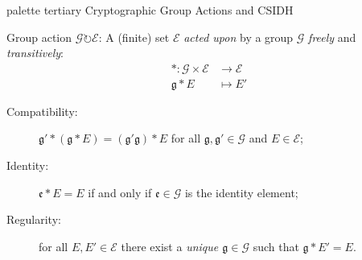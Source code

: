 \documentclass[aspectratio=169]{beamer}
\newcommand{\g}{{\mathfrak{g}}}
\newcommand{\G}{{\mathcal{G}}}
\newcommand{\E}{{\mathcal{E}}}
\begin{document}

\begin{frame}[plain]
  \begin{beamercolorbox}[sep=0.1px,center,wd=\paperwidth,sep=0.5\paperheight]{palette tertiary}
        \Huge\centering Cryptographic Group Actions and CSIDH
  \end{beamercolorbox}
\end{frame}


\begin{frame}
  \begin{block}{Group action}
    \emph{$\G\circlearrowright\E$}: A (finite) set $\E$ \emph{acted
      upon} by a group $\G$ \emph{freely} and \emph{transitively}:
    \begin{align*}
      * : \G × \E &→ \E\\
      \g * E &↦ E'
    \end{align*}
    \par\begin{description}
    \item[Compatibility:] \emph{$\g' * (\g * E) = (\g'\g)*E$} for all
      $\g,\g'\in\G$ and $E\in\E$;
    \item[Identity:] \emph{$\mathfrak{e} * E = E$} if and only if
      $\mathfrak{e}\in\G$ is the identity element;
    \item[Regularity:] for all $E,E'\in\E$ there exist a \emph{unique
        $\g\in\G$} such that \emph{$\g*E'=E$}.
      \setlength{\itemsep}{2em}
    \end{description}
  \end{block}
\end{frame}

\end{document}
